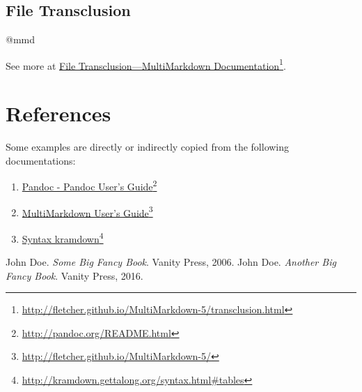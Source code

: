 \section{File Transclusion}
\label{filetransclusion}

@mmd

See more at \href{http://fletcher.github.io/MultiMarkdown-5/transclusion.html}{File Transclusion---MultiMarkdown Documentation}\footnote{\href{http://fletcher.github.io/MultiMarkdown-5/transclusion.html}{http:/\slash fletcher.github.io\slash MultiMarkdown-5\slash transclusion.html}}.

\chapter{References}
\label{references}

Some examples are directly or indirectly copied from the following documentations:

\begin{enumerate}
\item \href{http://pandoc.org/README.html}{Pandoc - Pandoc User’s Guide}\footnote{\href{http://pandoc.org/README.html}{http:/\slash pandoc.org\slash README.html}}

\item \href{http://fletcher.github.io/MultiMarkdown-5/}{MultiMarkdown User's Guide}\footnote{\href{http://fletcher.github.io/MultiMarkdown-5/}{http:/\slash fletcher.github.io\slash MultiMarkdown-5\slash }}

\item \href{http://kramdown.gettalong.org/syntax.html#tables}{Syntax \textbar{} kramdown}\footnote{\href{http://kramdown.gettalong.org/syntax.html\#tables}{http:/\slash kramdown.gettalong.org\slash syntax.html\#tables}}

\end{enumerate}

\begin{thebibliography}{0}



















John Doe. \emph{Some Big Fancy Book}. Vanity Press, 2006. 
John Doe. \emph{Another Big Fancy Book}. Vanity Press, 2016. 

\end{thebibliography}





